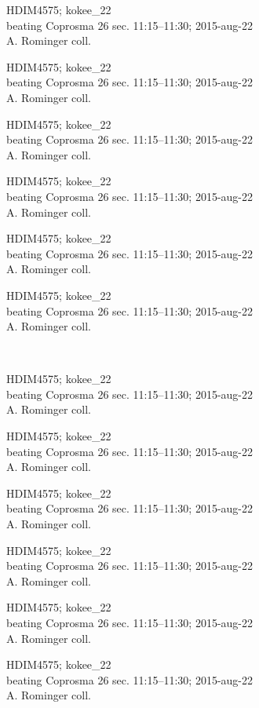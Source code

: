 \documentclass[2pt]{extarticle}
\begin{document}
\noindent
\parbox{0.16\textwidth}{\tiny \raggedright \rule[-0.3\baselineskip]{0pt}{10pt}HDIM4575; kokee\_22\\ beating Coprosma 26 sec. 11:15--11:30; 2015-aug-22\\ A. Rominger coll.}
\parbox{0.16\textwidth}{\tiny \raggedright \rule[-0.3\baselineskip]{0pt}{10pt}HDIM4575; kokee\_22\\ beating Coprosma 26 sec. 11:15--11:30; 2015-aug-22\\ A. Rominger coll.}
\parbox{0.16\textwidth}{\tiny \raggedright \rule[-0.3\baselineskip]{0pt}{10pt}HDIM4575; kokee\_22\\ beating Coprosma 26 sec. 11:15--11:30; 2015-aug-22\\ A. Rominger coll.}
\parbox{0.16\textwidth}{\tiny \raggedright \rule[-0.3\baselineskip]{0pt}{10pt}HDIM4575; kokee\_22\\ beating Coprosma 26 sec. 11:15--11:30; 2015-aug-22\\ A. Rominger coll.}
\parbox{0.16\textwidth}{\tiny \raggedright \rule[-0.3\baselineskip]{0pt}{10pt}HDIM4575; kokee\_22\\ beating Coprosma 26 sec. 11:15--11:30; 2015-aug-22\\ A. Rominger coll.}
\parbox{0.16\textwidth}{\tiny \raggedright \rule[-0.3\baselineskip]{0pt}{10pt}HDIM4575; kokee\_22\\ beating Coprosma 26 sec. 11:15--11:30; 2015-aug-22\\ A. Rominger coll.} \\ 
\vspace{0.001in} 

\noindent
\parbox{0.16\textwidth}{\tiny \raggedright \rule[-0.3\baselineskip]{0pt}{10pt}HDIM4575; kokee\_22\\ beating Coprosma 26 sec. 11:15--11:30; 2015-aug-22\\ A. Rominger coll.}
\parbox{0.16\textwidth}{\tiny \raggedright \rule[-0.3\baselineskip]{0pt}{10pt}HDIM4575; kokee\_22\\ beating Coprosma 26 sec. 11:15--11:30; 2015-aug-22\\ A. Rominger coll.}
\parbox{0.16\textwidth}{\tiny \raggedright \rule[-0.3\baselineskip]{0pt}{10pt}HDIM4575; kokee\_22\\ beating Coprosma 26 sec. 11:15--11:30; 2015-aug-22\\ A. Rominger coll.}
\parbox{0.16\textwidth}{\tiny \raggedright \rule[-0.3\baselineskip]{0pt}{10pt}HDIM4575; kokee\_22\\ beating Coprosma 26 sec. 11:15--11:30; 2015-aug-22\\ A. Rominger coll.}
\parbox{0.16\textwidth}{\tiny \raggedright \rule[-0.3\baselineskip]{0pt}{10pt}HDIM4575; kokee\_22\\ beating Coprosma 26 sec. 11:15--11:30; 2015-aug-22\\ A. Rominger coll.}
\parbox{0.16\textwidth}{\tiny \raggedright \rule[-0.3\baselineskip]{0pt}{10pt}HDIM4575; kokee\_22\\ beating Coprosma 26 sec. 11:15--11:30; 2015-aug-22\\ A. Rominger coll.} \\ 
\vspace{0.001in} 
\end{document}
